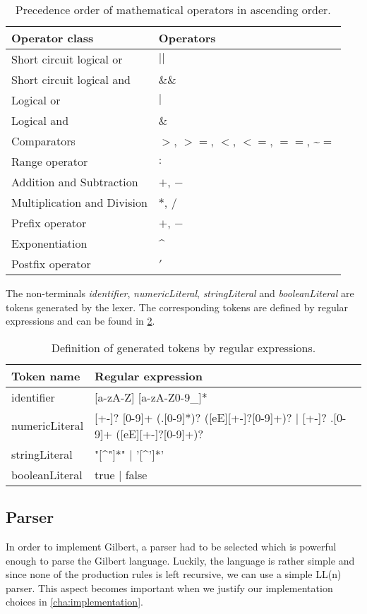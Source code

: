 \begin{table}[!h]
  \centering
  \begin{tabular}{l|l}
  Operator class & Operators\\
  \hline
  Short circuit logical or & $||$\\
  Short circuit logical and & $\&\&$\\
  Logical or & $|$ \\
  Logical and & $\&$ \\
  Comparators & $>$, $>=$, $<$, $<=$, $==$, \textasciitilde$=$\\
  Range operator & $:$ \\
  Addition and Subtraction & $+$, $-$\\
  Multiplication and Division & $*$, $/$\\
  Prefix operator & $+$, $-$\\
  Exponentiation & \textasciicircum\\
  Postfix operator & $'$
  \end{tabular}
  \caption{Precedence order of mathematical operators in ascending order.}
  \label{tab:precedences}
\end{table}

The non-terminals \emph{identifier}, \emph{numericLiteral}, \emph{stringLiteral} and \emph{booleanLiteral} are tokens generated by the lexer. The corresponding tokens are defined by regular expressions and can be found in \cref{tab:tokens}.

\begin{table}[!h]
  \centering
  \begin{tabular}{l|l}
  Token name & Regular expression\\
  \hline
  identifier & [a-zA-Z] [a-zA-Z0-9\_]*\\
  numericLiteral & [+-]? [0-9]+ (.[0-9]*)? ([eE][+-]?[0-9]+)? | [+-]? .[0-9]+ ([eE][+-]?[0-9]+)? \\
  stringLiteral & "[\textasciicircum"]*" | '[\textasciicircum']*'\\
  booleanLiteral & true | false
  \end{tabular}
  \caption{Definition of generated tokens by regular expressions.}
  \label{tab:tokens}
\end{table}

\subsection{Parser}

In order to implement Gilbert, a parser had to be selected which is powerful enough to parse the Gilbert language.
Luckily, the language is rather simple and since none of the production rules is left recursive, we can use a simple LL(n) parser.
This aspect becomes important when we justify our implementation choices in \cref{cha:implementation}.

